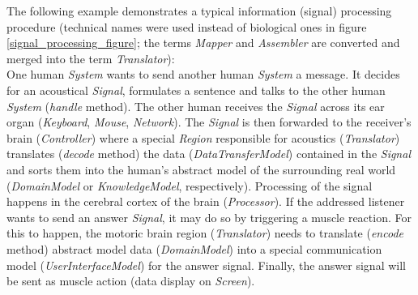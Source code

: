 The following example demonstrates a typical information (signal) processing
procedure (technical names were used instead of biological ones in figure
\ref{signal_processing_figure}; the terms \emph{Mapper} and \emph{Assembler}
are converted and merged into the term \emph{Translator}):\\
One human \emph{System} wants to send another human \emph{System} a message.
It decides for an acoustical \emph{Signal}, formulates a sentence and talks to
the other human \emph{System} (\emph{handle} method). The other human receives the
\emph{Signal} across its ear organ (\emph{Keyboard}, \emph{Mouse}, \emph{Network}).
The \emph{Signal} is then forwarded to the receiver's brain (\emph{Controller})
where a special \emph{Region} responsible for acoustics (\emph{Translator})
translates (\emph{decode} method) the data (\emph{DataTransferModel}) contained
in the \emph{Signal} and sorts them into the human's abstract model of the
surrounding real world (\emph{DomainModel} or \emph{KnowledgeModel}, respectively).
Processing of the signal happens in the cerebral cortex of the brain (\emph{Processor}).
If the addressed listener wants to send an answer \emph{Signal}, it may do so by
triggering a muscle reaction. For this to happen, the motoric brain region (\emph{Translator})
needs to translate (\emph{encode} method) abstract model data (\emph{DomainModel})
into a special communication model (\emph{UserInterfaceModel}) for the answer signal.
Finally, the answer signal will be sent as muscle action (data display on \emph{Screen}).

